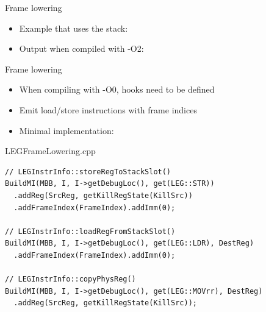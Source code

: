 
\begin{frame}{Frame lowering}

\begin{itemize}
    \item Example that uses the stack:
\end{itemize}


\begin{itemize}
    \item Output when compiled with -O2:
\end{itemize}


\end{frame}


\begin{frame}[fragile]{Frame lowering}

\begin{itemize}
    \item When compiling with  -O0, hooks need to be defined
    \item Emit load/store instructions with frame indices
    \item Minimal implementation:
\end{itemize}

\begin{block}{LEGFrameLowering.cpp}
\begin{lstlisting}
// LEGInstrInfo::storeRegToStackSlot()
BuildMI(MBB, I, I->getDebugLoc(), get(LEG::STR))
  .addReg(SrcReg, getKillRegState(KillSrc))
  .addFrameIndex(FrameIndex).addImm(0);

// LEGInstrInfo::loadRegFromStackSlot()
BuildMI(MBB, I, I->getDebugLoc(), get(LEG::LDR), DestReg)
  .addFrameIndex(FrameIndex).addImm(0);

// LEGInstrInfo::copyPhysReg()
BuildMI(MBB, I, I->getDebugLoc(), get(LEG::MOVrr), DestReg)
  .addReg(SrcReg, getKillRegState(KillSrc));
\end{lstlisting}
\end{block}

\end{frame}


